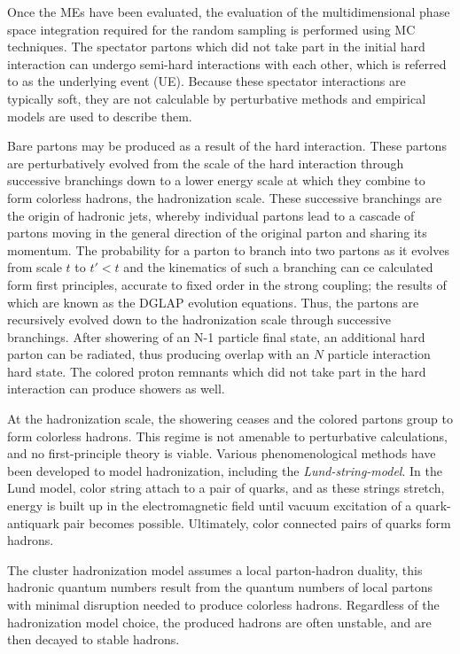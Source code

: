 Once the MEs have been evaluated, the evaluation of the multidimensional phase space integration required for the random sampling is performed using MC techniques. The spectator partons which did not take part in the initial hard interaction can undergo semi-hard interactions with each other, which is referred to as the underlying event (UE). Because these spectator interactions are typically soft, they are not calculable by perturbative methods and empirical models are used to describe them.

Bare partons may be produced as a result of the hard interaction. These partons are perturbatively evolved from the scale of the hard interaction through successive branchings down to a lower energy scale at which they combine to form colorless hadrons, the hadronization scale. These successive branchings are the origin of hadronic jets, whereby individual partons lead to a cascade of partons moving in the general direction of the original parton and sharing its momentum. The probability for a parton to branch into two partons as it evolves from scale $t$ to $t'<t$ and the kinematics of such a branching can ce calculated form first principles, accurate to fixed order in the strong coupling; the results of which are known as the DGLAP evolution equations\cite{Altarelli:1977zs}. Thus, the partons are recursively evolved down to the hadronization scale through successive branchings. After showering of an N-1 particle final state, an additional hard parton can be radiated, thus producing overlap with an $N$ particle interaction hard state. The colored proton remnants which did not take part in the hard interaction can produce showers as well. 

At the hadronization scale, the showering ceases and the colored partons group to form colorless hadrons. This regime is not amenable to perturbative calculations, and no first-principle theory is viable. Various phenomenological methods have been developed to model hadronization, including the \textit{Lund-string-model}\cite{ANDERSSON198331}. In the Lund model, color string attach to a pair of quarks, and as these strings stretch, energy is built up in the electromagnetic field until vacuum excitation of a quark-antiquark pair becomes possible. Ultimately, color connected pairs of quarks form hadrons. 

The cluster hadronization model assumes a local parton-hadron duality, this hadronic quantum numbers result from the quantum numbers of local partons with minimal disruption needed to produce colorless hadrons. Regardless of the hadronization model choice, the produced hadrons are often unstable, and are then decayed to stable hadrons.

